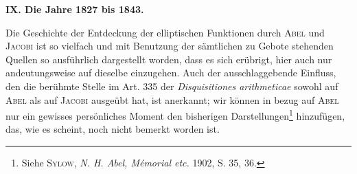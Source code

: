 \begin{center}\textbf{IX. Die Jahre 1827 bis 1843.}\end{center}
\begin{center}\end{center}
\noindent\hspace*{\parindent}Die Geschichte der Entdeckung der elliptischen Funktionen durch \textsc{Abel}
und \textsc{Jacobi} ist so vielfach und mit Benutzung der sämtlichen zu Gebote
stehenden Quellen so ausführlich dargestellt worden, dass es sich erübrigt,
hier auch nur andeutungsweise auf dieselbe einzugehen. Auch der ausschlaggebende
Einfluss, den die berühmte Stelle im Art. 335 der \textit{Disquisitiones arithmeticae}
sowohl auf \textsc{Abel} als auf \textsc{Jacobi} ausgeübt hat, ist anerkannt; wir können
in bezug auf \textsc{Abel} nur ein gewisses persönliches Moment den bisherigen Darstellungen\footnote{Siehe \textsc{Sylow}, \textit{N. H. Abel, Mémorial etc.} 1902, S. 35, 36.}
hinzufügen, das, wie es scheint, noch nicht bemerkt worden ist.

